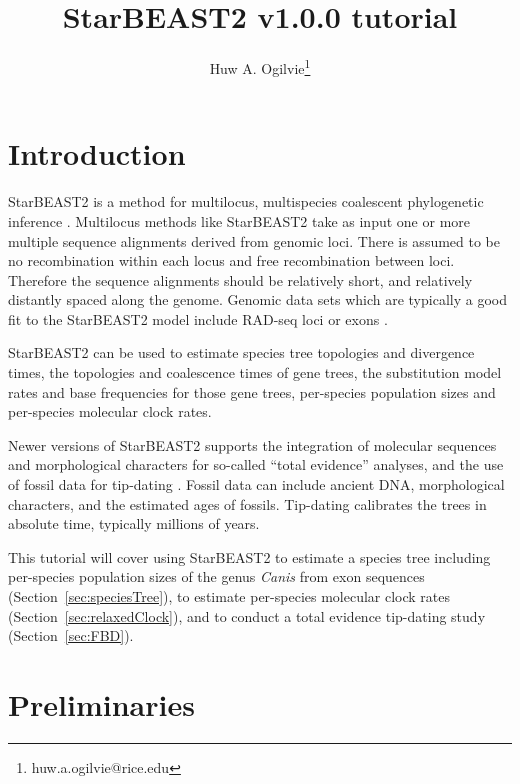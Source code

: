 \documentclass[12pt]{article}
\begin{document}
\title{StarBEAST2 v1.0.0 tutorial}
\author[1]{Huw A. Ogilvie\thanks{huw.a.ogilvie@rice.edu}}

\maketitle

\clearpage

\section{Introduction}
\label{sec:intro}

StarBEAST2 is a method for multilocus, multispecies coalescent phylogenetic
inference \parencite{Ogilvie2017}. Multilocus methods like StarBEAST2 take as
input one or more multiple sequence alignments derived from genomic loci.
There is assumed to be no recombination within each locus and free
recombination between loci. Therefore the sequence alignments should be
relatively short, and relatively distantly spaced along the genome. Genomic
data sets which are typically a good fit to the StarBEAST2 model include
RAD-seq loci \parencite{Ogilvie2016} or exons \parencite{Scornavacca2017}.

StarBEAST2 can be used to estimate species tree topologies and divergence
times, the topologies and coalescence times of gene trees, the substitution
model rates and base frequencies for those gene trees, per-species population
sizes and per-species molecular clock rates.

Newer versions of StarBEAST2 supports the integration of molecular sequences
and morphological characters for so-called ``total evidence'' analyses, and
the use of fossil data for tip-dating \parencite{Ogilvie2021}. Fossil data
can include ancient DNA, morphological characters, and the estimated ages of
fossils. Tip-dating calibrates the trees in absolute time, typically millions
of years.

This tutorial will cover using StarBEAST2 to estimate a species tree including
per-species population sizes of the genus \textit{Canis} from exon sequences
(Section~\ref{sec:speciesTree}),
to estimate per-species molecular clock rates
(Section~\ref{sec:relaxedClock}),
and to conduct a total evidence tip-dating study
(Section~\ref{sec:FBD}).

\section{Preliminaries}
\label{sec:prelim}
\end{document}
